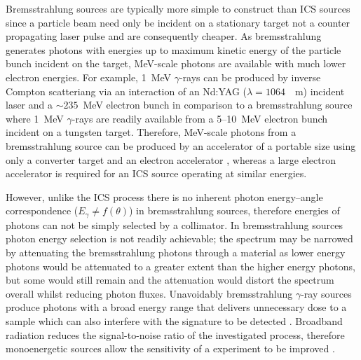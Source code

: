 \documentclass[../main.tex]{subfiles}
\begin{document}
Bremsstrahlung sources are typically more simple to construct than ICS sources since a particle beam need only be incident on a stationary target not a counter propagating laser pulse and are consequently cheaper. As bremsstrahlung generates photons with energies up to maximum kinetic energy of the particle bunch incident on the target, \si{\mega\electronvolt}-scale photons are available with much lower electron energies. For example, 1~\si{\mega\electronvolt} $\gamma$-rays can be produced by inverse Compton scatteriang via an interaction of an Nd:YAG ($\lambda = 1064$~\si{\nao\meter}) incident laser and a $\sim 235$~\si{\mega\electronvolt} electron bunch in comparison to a bremsstrahlung source where 1~\si{\mega\electronvolt} $\gamma$-rays are readily available from a 5--10~\si{\mega\electronvolt} electron bunch incident on a tungsten target. Therefore, \si{\mega\electronvolt}-scale photons from a bremsstrahlung source can be produced by an accelerator of a portable size using only a converter target and an electron
accelerator \cite{chin2021application}, whereas a large electron accelerator is required for an ICS source operating at similar energies.

However, unlike the ICS process there is no inherent photon energy--angle correspondence ($E_{\gamma}\neq f\left(\theta\right)$) in bremsstrahlung sources, therefore energies of photons can not be simply selected by a collimator. In bremsstrahlung sources photon energy selection is not readily achievable; the spectrum may be narrowed by attenuating the bremsstrahlung photons through a material as lower energy photons would be attenuated to a greater extent than the higher energy photons, but some would still remain and the attenuation would distort the spectrum overall whilst reducing photon fluxes. Unavoidably bremsstrahlung $\gamma$-ray sources produce photons with a broad energy range that delivers unnecessary dose to a sample which can also interfere with the signature to be detected \cite{geddes2017impact}. Broadband radiation reduces the signal-to-noise ratio of the investigated process, therefore monoenergetic sources allow the sensitivity of a experiment to be improved \cite{jones2008bremsstrahlung}.
\end{document}
